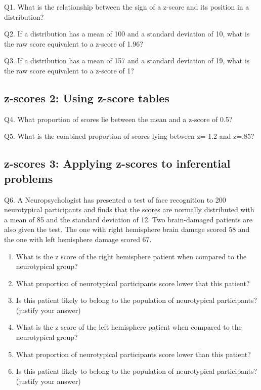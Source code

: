\documentclass[
]{book}
\begin{document}
Q1. What is the relationship between the sign of a z-score and its position in a distribution?

Q2. If a distribution has a mean of 100 and a standard deviation of 10, what is the raw score equivalent to a z-score of 1.96?

Q3. If a distribution has a mean of 157 and a standard deviation of 19, what is the raw score equivalent to a z-score of 1?

\hypertarget{z-scores-2-using-z-score-tables}{%
\subsection{z-scores 2: Using z-score tables}\label{z-scores-2-using-z-score-tables}}

Q4. What proportion of scores lie between the mean and a z-score of 0.5?

Q5. What is the combined proportion of scores lying between z=-1.2 and z=.85?

\hypertarget{z-scores-3-applying-z-scores-to-inferential-problems}{%
\subsection{z-scores 3: Applying z-scores to inferential problems}\label{z-scores-3-applying-z-scores-to-inferential-problems}}

Q6. A Neuropsychologist has presented a test of face recognition to 200 neurotypical participants and finds that the scores are normally distributed with a mean of 85 and the standard deviation of 12. Two brain-damaged patients are also given the test. The one with right hemisphere brain damage scored 58 and the one with left hemisphere damage scored 67.

\begin{enumerate}
\def\labelenumi{\arabic{enumi}.}
\item
  What is the z score of the right hemisphere patient when compared to the neurotypical group?
\item
  What proportion of neurotypical participants score lower that this patient?
\item
  Is this patient likely to belong to the population of neurotypical participants? (justify your answer)
\item
  What is the z score of the left hemisphere patient when compared to the neurotypical group?
\item
  What proportion of neurotypical participants score lower than this patient?
\item
  Is this patient likely to belong to the population of neurotypical participants? (justify your answer)
\end{enumerate}
\end{document}
